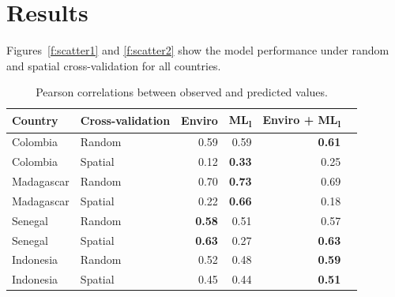 \documentclass[11pt]{article}
\begin{document}
\section{Results}

Figures~\ref{f:scatter1} and \ref{f:scatter2} show the model performance under random and spatial cross-validation for all countries. 




\begin{table}[h!]
\caption{Pearson correlations between observed and predicted values. }
\centering
\begin{tabular}{llrrrr}
Country &  Cross-validation & Enviro &  ML\textsubscript{l} &  Enviro + ML\textsubscript{l} \\
\hline 
 Colombia & Random &  0.59 & 0.59 & \textbf{0.61} \\
 Colombia &  Spatial &  0.12 &  \textbf{0.33} &  0.25\\
 Madagascar & Random &   0.70 &  \textbf{0.73} & 0.69 \\
 Madagascar &  Spatial &  0.22 &  \textbf{0.66} & 0.18\\
 Senegal &  Random &  \textbf{0.58} &  0.51 & 0.57 \\
 Senegal &  Spatial &  \textbf{0.63} &  0.27 &  \textbf{0.63} \\
 Indonesia &  Random &  0.52 &  0.48 &  \textbf{0.59} \\
 Indonesia &  Spatial &  0.45 &  0.44 &  \textbf{0.51} \\
\end{tabular}
\label{t:results}
\end{table}
\end{document}
